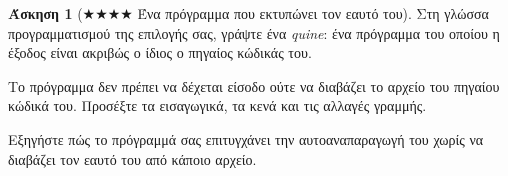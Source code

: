 \documentclass[11pt,a4paper]{article}
\theoremstyle{definition}
\newtheorem{question}{Άσκηση}
\begin{document}
\begin{question}[$\bigstar\bigstar\bigstar\bigstar$ Ένα πρόγραμμα που εκτυπώνει τον εαυτό του]
 

Στη γλώσσα προγραμματισμού της επιλογής σας,
γράψτε ένα \emph{quine}: ένα πρόγραμμα του οποίου
η έξοδος είναι ακριβώς ο ίδιος ο πηγαίος κώδικάς του.

Το πρόγραμμα δεν πρέπει να δέχεται είσοδο ούτε
να διαβάζει το αρχείο του πηγαίου κώδικά του.
Προσέξτε τα εισαγωγικά, τα κενά και τις αλλαγές γραμμής.

Εξηγήστε πώς το πρόγραμμά σας επιτυγχάνει
την αυτοαναπαραγωγή του χωρίς να διαβάζει τον εαυτό του
από κάποιο αρχείο.
\end{question}
\end{document}
